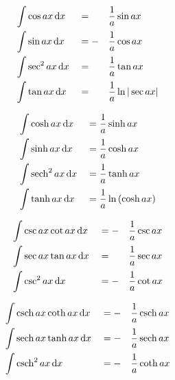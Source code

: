 \begin{myminipage}[t]{0.5\linewidth}
    \begin{HackEquationLeftAlign}
    \begin{alignat*}{3}
        &\int{\cos{ax} \,\diff{x}} &&= && \frac{1}{a} \sin{ax} \\
        &\int{\sin{ax} \,\diff{x}} &&= -&& \frac{1}{a} \cos{ax} \\
        &\int{\sec^2{ax} \,\diff{x}} &&= && \frac{1}{a} \tan{ax} \\
        &\int{\tan{ax} \,\diff{x}} &&= && \frac{1}{a} \ln{\abs{\sec{ax}}}
    \end{alignat*}
    \end{HackEquationLeftAlign}%
\end{myminipage}%
\begin{myminipage}[t]{0.5\linewidth}
    \begin{HackEquationLeftAlign}
    \begin{alignat*}{2}
        &\int{\cosh{ax} \,\diff{x}} &&= \frac{1}{a} \sinh{ax} \\
        &\int{\sinh{ax} \,\diff{x}} &&= \frac{1}{a} \cosh{ax} \\
        &\int{\sech^2{ax} \,\diff{x}} &&= \frac{1}{a} \tanh{ax} \\
        &\int{\tanh{ax} \,\diff{x}} &&= \frac{1}{a} \ln{\parens*{\cosh{ax}}}
    \end{alignat*}
    \end{HackEquationLeftAlign}%
\end{myminipage}


\begin{myminipage}[t]{0.5\linewidth}
    \begin{HackEquationLeftAlign}
    \begin{alignat*}{3}
        &\int{\csc{ax} \cot{ax} \,\diff{x}} &&= -&& \frac{1}{a} \csc{ax} \\
        &\int{\sec{ax} \tan{ax} \,\diff{x}} &&= && \frac{1}{a} \sec{ax} \\
        &\int{\csc^2{ax} \,\diff{x}} &&= -&& \frac{1}{a} \cot{ax}
    \end{alignat*}
    \end{HackEquationLeftAlign}%
\end{myminipage}%
\begin{myminipage}[t]{0.5\linewidth}
    \begin{HackEquationLeftAlign}
    \begin{alignat*}{3}
        &\int{\csch{ax} \coth{ax} \,\diff{x}} &&= -&& \frac{1}{a} \csch{ax} \\
        &\int{\sech{ax} \tanh{ax} \,\diff{x}} &&= -&& \frac{1}{a} \sech{ax} \\
        &\int{\csch^2{ax} \,\diff{x}} &&= -&& \frac{1}{a} \coth{ax}
    \end{alignat*}
    \end{HackEquationLeftAlign}%
\end{myminipage}


